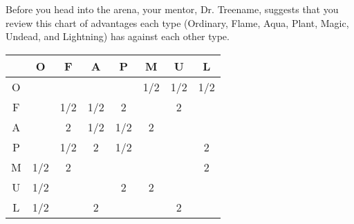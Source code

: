 

Before you head into the arena, your \mappMobimon{} mentor, Dr. Treename,
suggests that you review this chart of advantages each \mappMobimon{} type
(Ordinary, Flame, Aqua, Plant, Magic, Undead, and Lightning) has against
each other type.

\begin{center}
\begin{tabular}{c|c|c|c|c|c|c|c|}
     &  O  &  F  &  A  &  P  &  M  &  U  &  L  \\\hline
  O  &     &     &     &     & 1/2 & 1/2 & 1/2 \\\hline
  F  &     & 1/2 & 1/2 &  2  &     &  2  &     \\\hline
  A  &     &  2  & 1/2 & 1/2 &  2  &     &     \\\hline
  P  &     & 1/2 &  2  & 1/2 &     &     &  2  \\\hline
  M  & 1/2 &  2  &     &     &     &     &  2  \\\hline
  U  & 1/2 &     &     &  2  &  2  &     &     \\\hline
  L  & 1/2 &     &  2  &     &     &  2  &     \\\hline
\end{tabular}
\end{center}



